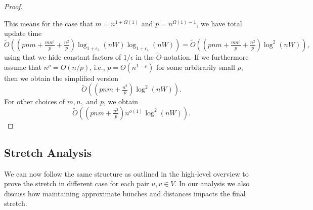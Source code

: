 \documentclass[11pt]{article}
\theoremstyle{definition}
\theoremstyle{remark}
\begin{document}
\begin{proof}
\begin{itemize}
\end{itemize}
This means for the case that $m=n^{1+\Omega(1)}$ and $p=n^{\Omega(1)-1}$, we have total update time
$$ \tilde O ((pnm + \tfrac{mn^{\rho}}{p}  + \tfrac{n^2}{ p})\log_{1+\epsilon_3}(nW)\log_{1+\epsilon_4}(nW)) = \tilde O ((pnm + \tfrac{mn^{\rho}}{p} + \tfrac{n^2}{ p})\log^2(nW)), $$
using that we hide constant factors of $1/\epsilon$ in the $\tilde O$-notation. If we furthermore assume that $n^\rho = O(n/p)$, i.e., $p = O(n^{1-\rho})$ for some arbitrarily small $\rho$, then we obtain the simplified version
$$ \tilde O ((pnm +   \tfrac{n^2}{ p})\log^2(nW)).$$
For other choices of $m,n,$ and $p$, we obtain 
$$ \tilde O ((pnm + \tfrac{n^2}{ p})n^{o(1)}\log^2(nW)). $$
\end{proof}



\subsection{Stretch Analysis}\label{sc:mult_stretch}
We can now follow the same structure as outlined in the high-level overview to prove the stretch in different case for each pair $u,v \in V$. In our analysis we also discuss how maintaining approximate bunches and distances impacts the final stretch.
\end{document}
